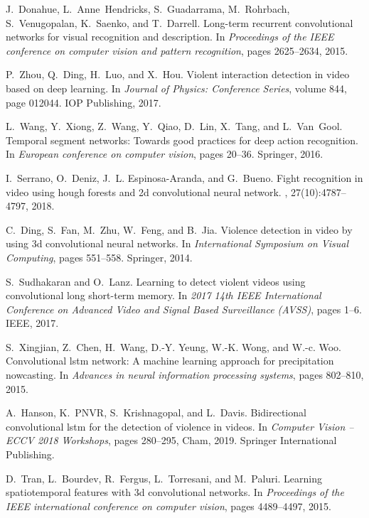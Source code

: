 \documentclass[10pt,twocolumn,letterpaper]{article}
\begin{document}
{\begin{thebibliography}{10}
J.~Donahue, L.~Anne~Hendricks, S.~Guadarrama, M.~Rohrbach, S.~Venugopalan, K.~Saenko, and T.~Darrell.
\newblock Long-term recurrent convolutional networks for visual recognition and description.
\newblock In {\em Proceedings of the IEEE conference on computer vision and pattern recognition}, pages 2625--2634, 2015.

P.~Zhou, Q.~Ding, H.~Luo, and X.~Hou.
\newblock Violent interaction detection in video based on deep learning.
\newblock In {\em Journal of Physics: Conference Series}, volume 844, page 012044. IOP Publishing, 2017.

L.~Wang, Y.~Xiong, Z.~Wang, Y.~Qiao, D.~Lin, X.~Tang, and L.~Van~Gool.
\newblock Temporal segment networks: Towards good practices for deep action recognition.
\newblock In {\em European conference on computer vision}, pages 20--36. Springer, 2016.

I.~Serrano, O.~Deniz, J.~L. Espinosa-Aranda, and G.~Bueno.
\newblock Fight recognition in video using hough forests and 2d convolutional neural network.
, 27(10):4787--4797, 2018.

C.~Ding, S.~Fan, M.~Zhu, W.~Feng, and B.~Jia.
\newblock Violence detection in video by using 3d convolutional neural networks.
\newblock In {\em International Symposium on Visual Computing}, pages 551--558. Springer, 2014.

S.~Sudhakaran and O.~Lanz.
\newblock Learning to detect violent videos using convolutional long short-term memory.
\newblock In {\em 2017 14th IEEE International Conference on Advanced Video and Signal Based Surveillance (AVSS)}, pages 1--6. IEEE, 2017.

S.~Xingjian, Z.~Chen, H.~Wang, D.-Y. Yeung, W.-K. Wong, and W.-c. Woo.
\newblock Convolutional lstm network: A machine learning approach for precipitation nowcasting.
\newblock In {\em Advances in neural information processing systems}, pages 802--810, 2015.

A.~Hanson, K.~PNVR, S.~Krishnagopal, and L.~Davis.
\newblock Bidirectional convolutional lstm for the detection of violence in videos.
\newblock In {\em Computer Vision -- ECCV 2018 Workshops}, pages 280--295, Cham, 2019. Springer International Publishing.

D.~Tran, L.~Bourdev, R.~Fergus, L.~Torresani, and M.~Paluri.
\newblock Learning spatiotemporal features with 3d convolutional networks.
\newblock In {\em Proceedings of the IEEE international conference on computer vision}, pages 4489--4497, 2015.


\end{thebibliography}}
\end{document}
